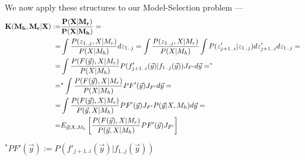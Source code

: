 \documentclass[10pt,a4paper]{article}
\begin{document}
We now apply these structures to our Model-Selection problem ---\\

\begin{align*} \label{param_map}
\bf{K(M_h, M_r|X)} :=& \bf{ \frac{P(X|M_r)}{P(X|M_h)}}=\\
=& \int \frac{P(z_{1..j},X|M_r)}{P(X|M_h)} dz_{1..j} = \int \frac{P(z_{1..j},X|M_r)}{P(X|M_h)} \int P(z'_{j+1..i}|z_{1..j}) dz'_{j+1..i} dz_{1..j} =\\ 
=& \int \frac{P(F(\vec{y}),X|M_r)}{P(X|M_h)} P(f'_{j+1..i}(\vec{y})|f_{1..j}(\vec{y})) J_{F'}d\vec{y} =^*\\
=&^* \int \frac{P(F(\vec{y}),X|M_r)}{P(X|M_h)} PF'(\vec{y}) J_{F'} d\vec{y}=\\ 
=& \int \frac{P(F(\vec{y}),X|M_r)}{P(\vec{y}, X|M_h)} PF'(\vec{y}) J_{F'} P(\vec{y}|X, M_h) d\vec{y} = \\
=& E_{\vec{y}|X,M_h} \left [\frac{P(F(\vec{y}),X|M_r)}{P(\vec{y}, X|M_h)} PF'(\vec{y}) J_{F'} \right ]
\end{align*}









\indent\indent\indent\indent\indent\indent\indent\indent\indent\indent\indent\indent\indent\indent\indent\indent\indent\indent \small  $^* PF'(\vec{y}) := P(f'_{j+1..i}(\vec{y})|f_{1..j}(\vec{y})) $ \normalsize
\end{document}
